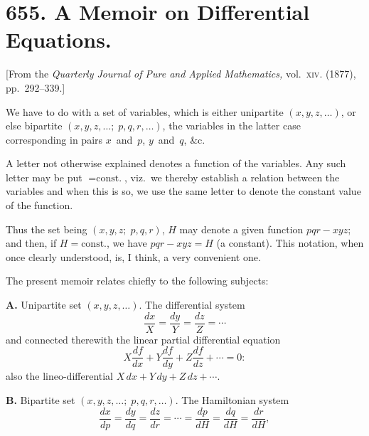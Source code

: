 \documentclass[11pt,a4paper]{book}
\begin{document}
\newpage

\section*{655. A Memoir on Differential Equations.}

\begin{center}
[From the \textit{Quarterly Journal of Pure and Applied Mathematics,} vol.~\textsc{xiv}. (1877), pp.~292--339.]
\end{center}

\setcounter{page}{113}

We have to do with a set of variables, which is either unipartite $(x, y, z, \ldots)$, or else bipartite $(x, y, z, \ldots;\; p, q, r, \ldots)$, the variables in the latter case corresponding in pairs $x$~and~$p$, $y$~and~$q$, \&c.

A letter not otherwise explained denotes a function of the variables. Any such letter may be put $= \text{const.}$, viz.~we thereby establish a relation between the variables and when this is so, we use the same letter to denote the constant value of the function.

Thus the set being $(x, y, z;\; p, q, r)$, $H$ may denote a given function $pqr - xyz$; and then, if $H = \text{const.}$, we have $pqr - xyz = H$ (a constant). This notation, when once clearly understood, is, I think, a very convenient one.

The present memoir relates chiefly to the following subjects:

\textbf{A.} Unipartite set $(x, y, z, \ldots)$. The differential system
\[
\frac{dx}{X} = \frac{dy}{Y} = \frac{dz}{Z} = \cdots
\]
and connected therewith the linear partial differential equation
\[
X\frac{df}{dx} + Y\frac{df}{dy} + Z\frac{df}{dz} + \cdots = 0:
\]
also the lineo-differential $X\,dx + Y\,dy + Z\,dz + \cdots$.

\textbf{B.} Bipartite set $(x, y, z, \ldots;\; p, q, r, \ldots)$. The Hamiltonian system
\[
\frac{dx}{dp} = \frac{dy}{dq} = \frac{dz}{dr} = \cdots = \frac{dp}{dH} = \frac{dq}{dH} = \frac{dr}{dH},
\]
\end{document}
